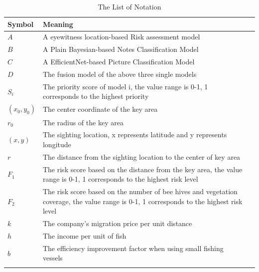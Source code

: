 \documentclass{mcmthesis}
\numberwithin{figure}{section}
\numberwithin{table}{section}
\begin{document}
\begin{center}
\begin{longtable}{p{}p{}m{}}
\caption{The List of Notation}\\
\hline
Symbol& Meaning \\
\hline

$A$      & A eyewitness location-based Risk assessment model
                                                         \\
$B$      & A Plain Bayesian-based Notes Classification Model
                                                          \\
$C$     & A EfficientNet-based Picture Classification Model
                                                        \\
$D$       & The fusion model of the above three single models                                                       \\
$S_i$      & The priority score of model i, the value range is 0-1, 1 corresponds to the highest priority
                                                            \\
$(x_0,y_0)$       & The center coordinate of the key area
                                 \\
$r_0$       & The radius of the key area
                                         \\
$(x,y)$       & The sighting location, x represents latitude and y represents longitude
\\
$r$       & The distance from the sighting location to the center of key area \\
$F_1$       & The risk score based on the distance from the key area, the value range is 0-1, 1 corresponds to the highest risk level \\
$F_2$      &  The risk score based on the number of bee hives and vegetation coverage, the value range is 0-1, 1 corresponds to the highest risk level
\\

$k$       & The company's migration price per unit distance
\\
$h$       & The income per unit of fish                                                                \\
$b$       & The efficiency improvement factor when using small fishing vessels                         \\
                                                        \\ \hline

 \end{longtable}
 \end{center}
\end{document}
